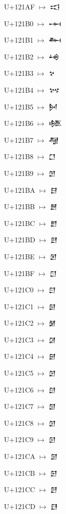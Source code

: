 {\noindent U+121AF  $\mapsto$ {\cufont 𒆯}\par
\noindent U+121B0  $\mapsto$ {\cufont 𒆰}\par
\noindent U+121B1  $\mapsto$ {\cufont 𒆱}\par
\noindent U+121B2  $\mapsto$ {\cufont 𒆲}\par
\noindent U+121B3  $\mapsto$ {\cufont 𒆳}\par
\noindent U+121B4  $\mapsto$ {\cufont 𒆴}\par
\noindent U+121B5  $\mapsto$ {\cufont 𒆵}\par
\noindent U+121B6  $\mapsto$ {\cufont 𒆶}\par
\noindent U+121B7  $\mapsto$ {\cufont 𒆷}\par
\noindent U+121B8  $\mapsto$ {\cufont 𒆸}\par
\noindent U+121B9  $\mapsto$ {\cufont 𒆹}\par
\noindent U+121BA  $\mapsto$ {\cufont 𒆺}\par
\noindent U+121BB  $\mapsto$ {\cufont 𒆻}\par
\noindent U+121BC  $\mapsto$ {\cufont 𒆼}\par
\noindent U+121BD  $\mapsto$ {\cufont 𒆽}\par
\noindent U+121BE  $\mapsto$ {\cufont 𒆾}\par
\noindent U+121BF  $\mapsto$ {\cufont 𒆿}\par
\noindent U+121C0  $\mapsto$ {\cufont 𒇀}\par
\noindent U+121C1  $\mapsto$ {\cufont 𒇁}\par
\noindent U+121C2  $\mapsto$ {\cufont 𒇂}\par
\noindent U+121C3  $\mapsto$ {\cufont 𒇃}\par
\noindent U+121C4  $\mapsto$ {\cufont 𒇄}\par
\noindent U+121C5  $\mapsto$ {\cufont 𒇅}\par
\noindent U+121C6  $\mapsto$ {\cufont 𒇆}\par
\noindent U+121C7  $\mapsto$ {\cufont 𒇇}\par
\noindent U+121C8  $\mapsto$ {\cufont 𒇈}\par
\noindent U+121C9  $\mapsto$ {\cufont 𒇉}\par
\noindent U+121CA  $\mapsto$ {\cufont 𒇊}\par
\noindent U+121CB  $\mapsto$ {\cufont 𒇋}\par
\noindent U+121CC  $\mapsto$ {\cufont 𒇌}\par
\noindent U+121CD  $\mapsto$ {\cufont 𒇍}\par
}
